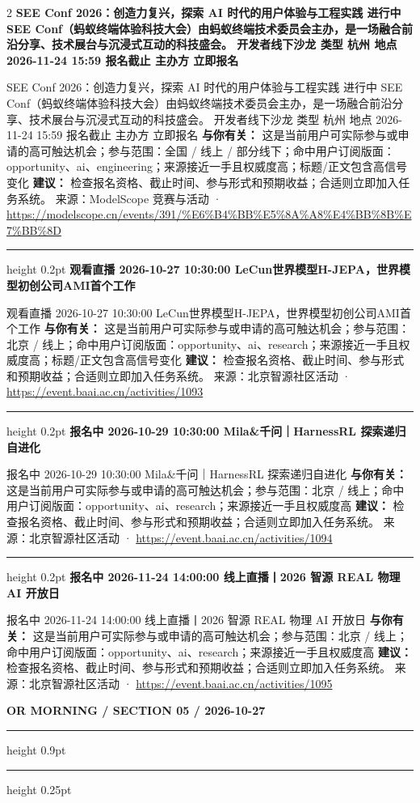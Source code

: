\documentclass[10.5pt]{ctexart}
\begin{document}
\begin{multicols}{2}
{\large\bfseries SEE Conf 2026：创造力复兴，探索 AI 时代的用户体验与工程实践 进行中 SEE Conf（蚂蚁终端体验科技大会）由蚂蚁终端技术委员会主办，是一场融合前沿分享、技术展台与沉浸式互动的科技盛会。 开发者线下沙龙 类型 杭州 地点 2026-11-24 15:59 报名截止 主办方 立即报名}\par
SEE Conf 2026：创造力复兴，探索 AI 时代的用户体验与工程实践 进行中 SEE Conf（蚂蚁终端体验科技大会）由蚂蚁终端技术委员会主办，是一场融合前沿分享、技术展台与沉浸式互动的科技盛会。 开发者线下沙龙 类型 杭州 地点 2026-11-24 15:59 报名截止 主办方 立即报名
\textbf{与你有关：} 这是当前用户可实际参与或申请的高可触达机会；参与范围：全国 / 线上 / 部分线下；命中用户订阅版面：opportunity、ai、engineering；来源接近一手且权威度高；标题/正文包含高信号变化
\textbf{建议：} 检查报名资格、截止时间、参与形式和预期收益；合适则立即加入任务系统。
{\footnotesize\color{ormuted} 来源：ModelScope 竞赛与活动 · \url{https://modelscope.cn/events/391/%E6%B4%BB%E5%8A%A8%E4%BB%8B%E7%BB%8D}}
\vspace{2mm}
\hrule height 0.2pt
\vspace{2mm}
{\large\bfseries 观看直播 2026-10-27 10:30:00 LeCun世界模型H-JEPA，世界模型初创公司AMI首个工作}\par
观看直播 2026-10-27 10:30:00 LeCun世界模型H-JEPA，世界模型初创公司AMI首个工作
\textbf{与你有关：} 这是当前用户可实际参与或申请的高可触达机会；参与范围：北京 / 线上；命中用户订阅版面：opportunity、ai、research；来源接近一手且权威度高；标题/正文包含高信号变化
\textbf{建议：} 检查报名资格、截止时间、参与形式和预期收益；合适则立即加入任务系统。
{\footnotesize\color{ormuted} 来源：北京智源社区活动 · \url{https://event.baai.ac.cn/activities/1093}}
\vspace{2mm}
\hrule height 0.2pt
\vspace{2mm}
{\large\bfseries 报名中 2026-10-29 10:30:00 Mila\&千问｜HarnessRL 探索递归自进化}\par
报名中 2026-10-29 10:30:00 Mila\&千问｜HarnessRL 探索递归自进化
\textbf{与你有关：} 这是当前用户可实际参与或申请的高可触达机会；参与范围：北京 / 线上；命中用户订阅版面：opportunity、ai、research；来源接近一手且权威度高
\textbf{建议：} 检查报名资格、截止时间、参与形式和预期收益；合适则立即加入任务系统。
{\footnotesize\color{ormuted} 来源：北京智源社区活动 · \url{https://event.baai.ac.cn/activities/1094}}
\vspace{2mm}
\hrule height 0.2pt
\vspace{2mm}
{\large\bfseries 报名中 2026-11-24 14:00:00 线上直播丨2026 智源 REAL 物理 AI 开放日}\par
报名中 2026-11-24 14:00:00 线上直播丨2026 智源 REAL 物理 AI 开放日
\textbf{与你有关：} 这是当前用户可实际参与或申请的高可触达机会；参与范围：北京 / 线上；命中用户订阅版面：opportunity、ai、research；来源接近一手且权威度高
\textbf{建议：} 检查报名资格、截止时间、参与形式和预期收益；合适则立即加入任务系统。
{\footnotesize\color{ormuted} 来源：北京智源社区活动 · \url{https://event.baai.ac.cn/activities/1095}}
\end{multicols}
\newpage
{\small\bfseries OR MORNING / SECTION 05 / 2026-10-27}
\vspace{2mm}
\hrule height 0.9pt
\vspace{1.5mm}
\hrule height 0.25pt
\vspace{4mm}
\end{document}
